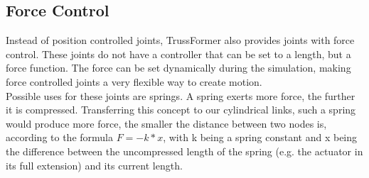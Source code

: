 \subsection{Force Control}
Instead of position controlled joints, TrussFormer also provides joints with force control. These joints do not have a controller that can be set to a length, but a force function. The force can be set dynamically during the simulation, making force controlled joints a very flexible way to create motion.\\
Possible uses for these joints are springs. A spring exerts more force, the further it is compressed. Transferring this concept to our cylindrical links, such a spring would produce more force, the smaller the distance between two nodes is, according to the formula $F = -k * x$, with k being a spring constant and x being the difference between the uncompressed length of the spring (e.g. the actuator in its full extension) and its current length.

